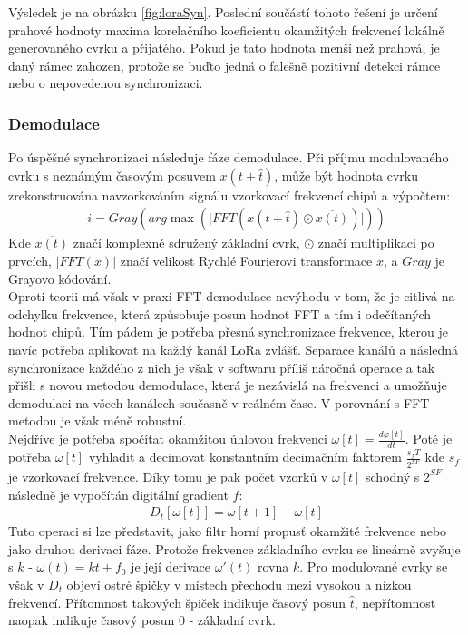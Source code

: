 \documentclass{ctuthesis}
\begin{document}
Výsledek je na obrázku \ref{fig:loraSyn}. Poslední součástí tohoto řešení je určení prahové hodnoty maxima korelačního koeficientu okamžitých frekvencí lokálně generovaného cvrku a přijatého. Pokud je tato hodnota menší než prahová, je daný rámec zahozen, protože se buďto jedná o falešně pozitivní detekci rámce nebo o nepovedenou synchronizaci.
\subsubsection{Demodulace}
\label{subsec:demodulace}
Po úspěšné synchronizaci následuje fáze demodulace. Při příjmu modulovaného cvrku s neznámým časovým posuvem $x(t + \hat{t})$, může být hodnota cvrku zrekonstruována navzorkováním signálu vzorkovací frekvencí chipů a výpočtem:
\begin{align}i= Gray(arg \max (\lvert FFT(x(t+ \hat{t}) \odot \overline{x(t)}) \rvert ))
\label{eq:lora2}
\end{align}
Kde $\overline{x(t)}$ značí komplexně sdružený základní cvrk, $\odot$ značí multiplikaci po prvcích, $\lvert FFT(x) \rvert$ značí velikost Rychlé Fourierovi transformace $x$, a $Gray$ je Grayovo kódování. \\
Oproti teorii má však v praxi FFT demodulace nevýhodu v tom, že je citlivá na odchylku frekvence, která způsobuje posun hodnot FFT a tím i odečítaných hodnot chipů. Tím pádem je potřeba přesná synchronizace frekvence, kterou je navíc potřeba aplikovat na každý kanál LoRa zvlášť. Separace kanálů a následná synchronizace každého z nich je však v softwaru příliš náročná operace a tak \cite{gr-lora2018} přišli s novou metodou demodulace, která je nezávislá na frekvenci a umožňuje demodulaci na všech kanálech současně v reálném čase. V porovnání s FFT metodou je však méně robustní.\\
Nejdříve je potřeba spočítat okamžitou úhlovou frekvenci $\omega[t]=\frac{d\varphi[t]}{dt}$. Poté je potřeba $\omega[t]$ vyhladit a decimovat konstantním decimačním faktorem $\frac{s_fT}{2^{SF}}$ kde $s_f$ je vzorkovací frekvence. Díky tomu je pak počet vzorků v $\omega[t]$ schodný s $2^{SF}$ následně je vypočítán digitální gradient $f$:
\begin{align}
D_t[\omega[t]] = \omega[t+1]-\omega[t]
\label{eq:lora7}
\end{align}
Tuto operaci si lze představit, jako filtr horní propusť okamžité frekvence nebo jako druhou derivaci fáze. Protože frekvence základního cvrku se lineárně zvyšuje s $k$ - $\omega(t) = kt + f_0$ je její derivace $\omega'(t)$ rovna $k$. Pro modulované cvrky se však v $D_t$ objeví ostré špičky v místech přechodu mezi vysokou a nízkou frekvencí. Přítomnost takových špiček indikuje časový posun $\hat{t}$, nepřítomnost naopak indikuje časový posun 0 - základní cvrk.\\
\end{document}
